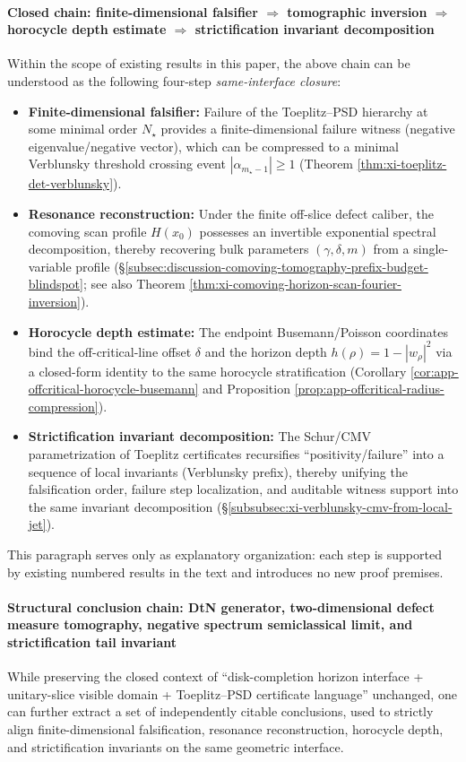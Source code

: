 \paragraph{Closed chain: finite-dimensional falsifier \texorpdfstring{$\Rightarrow$}{=>} tomographic inversion \texorpdfstring{$\Rightarrow$}{=>} horocycle depth estimate \texorpdfstring{$\Rightarrow$}{=>} strictification invariant decomposition}
Within the scope of existing results in this paper, the above chain can be understood as the following four-step \emph{same-interface closure}:
\begin{itemize}
  \item \textbf{Finite-dimensional falsifier:} Failure of the Toeplitz--PSD hierarchy at some minimal order \(N_\star\) provides a finite-dimensional failure witness (negative eigenvalue/negative vector), which can be compressed to a minimal Verblunsky threshold crossing event \(|\alpha_{m_\star-1}|\ge 1\) (Theorem \ref{thm:xi-toeplitz-det-verblunsky}).
  \item \textbf{Resonance reconstruction:} Under the finite off-slice defect caliber, the comoving scan profile \(H(x_0)\) possesses an invertible exponential spectral decomposition, thereby recovering bulk parameters \((\gamma,\delta,m)\) from a single-variable profile (\S\ref{subsec:discussion-comoving-tomography-prefix-budget-blindspot}; see also Theorem \ref{thm:xi-comoving-horizon-scan-fourier-inversion}).
  \item \textbf{Horocycle depth estimate:} The endpoint Busemann/Poisson coordinates bind the off-critical-line offset \(\delta\) and the horizon depth \(h(\rho)=1-|w_\rho|^2\) via a closed-form identity to the same horocycle stratification (Corollary \ref{cor:app-offcritical-horocycle-busemann} and Proposition \ref{prop:app-offcritical-radius-compression}).
  \item \textbf{Strictification invariant decomposition:} The Schur/CMV parametrization of Toeplitz certificates recursifies ``positivity/failure'' into a sequence of local invariants (Verblunsky prefix), thereby unifying the falsification order, failure step localization, and auditable witness support into the same invariant decomposition (\S\ref{subsubsec:xi-verblunsky-cmv-from-local-jet}).
\end{itemize}
This paragraph serves only as explanatory organization: each step is supported by existing numbered results in the text and introduces no new proof premises.
\par

\paragraph{Structural conclusion chain: DtN generator, two-dimensional defect measure tomography, negative spectrum semiclassical limit, and strictification tail invariant}
While preserving the closed context of ``disk-completion horizon interface + unitary-slice visible domain + Toeplitz--PSD certificate language'' unchanged, one can further extract a set of independently citable conclusions, used to strictly align finite-dimensional falsification, resonance reconstruction, horocycle depth, and strictification invariants on the same geometric interface.

